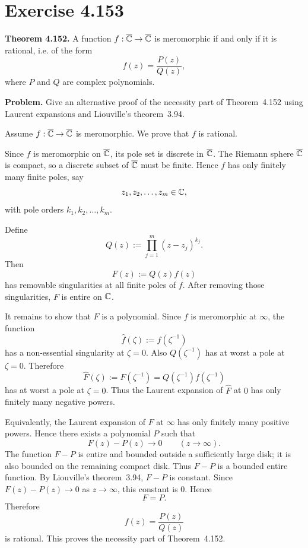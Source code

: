 \documentclass{article}
\providecommand{\Chat}{\overline{\C}}
\begin{document}
\section{Exercise 4.153}

\textbf{Theorem 4.152.}
A function $f:\Chat\to\Chat$ is meromorphic if and only if it is rational,
i.e. of the form
\[
  f(z)=\frac{P(z)}{Q(z)},
\]
where $P$ and $Q$ are complex polynomials.

\textbf{Problem.}
Give an alternative proof of the necessity part of Theorem~4.152 using
Laurent expansions and Liouville's theorem~3.94.

\begin{solution}
  Assume $f:\Chat\to\Chat$ is meromorphic. We prove that $f$ is rational.

  Since $f$ is meromorphic on $\Chat$, its pole set is discrete in $\Chat$.
  The Riemann sphere $\Chat$ is compact, so a discrete subset of $\Chat$ must be
  finite. Hence $f$ has only finitely many finite poles, say
  \[
    z_1,z_2,\dots,z_m\in\mathbb{C},
  \]
  with pole orders $k_1,k_2,\dots,k_m$.

  Define
  \[
    Q(z):=\prod_{j=1}^m (z-z_j)^{k_j}.
  \]
  Then
  \[
    F(z):=Q(z)f(z)
  \]
  has removable singularities at all finite poles of $f$. After removing those
  singularities, $F$ is entire on $\mathbb{C}$.

  It remains to show that $F$ is a polynomial. Since $f$ is meromorphic at
  $\infty$, the function
  \[
    \widehat f(\zeta):=f(\zeta^{-1})
  \]
  has a non-essential singularity at $\zeta=0$. Also $Q(\zeta^{-1})$ has at
  worst a pole at $\zeta=0$. Therefore
  \[
    \widehat F(\zeta):=F(\zeta^{-1})=Q(\zeta^{-1})f(\zeta^{-1})
  \]
  has at worst a pole at $\zeta=0$. Thus the Laurent expansion of
  $\widehat F$ at $0$ has only finitely many negative powers.

  Equivalently, the Laurent expansion of $F$ at $\infty$ has only finitely many
  positive powers. Hence there exists a polynomial $P$ such that
  \[
    F(z)-P(z)\to 0
    \qquad (z\to\infty).
  \]
  The function $F-P$ is entire and bounded outside a sufficiently large disk;
  it is also bounded on the remaining compact disk. Thus $F-P$ is a bounded
  entire function. By Liouville's theorem~3.94, $F-P$ is constant. Since
  $F(z)-P(z)\to0$ as $z\to\infty$, this constant is $0$. Hence
  \[
    F=P.
  \]
  Therefore
  \[
    f(z)=\frac{P(z)}{Q(z)}
  \]
  is rational. This proves the necessity part of Theorem~4.152.
\end{solution}
\end{document}
